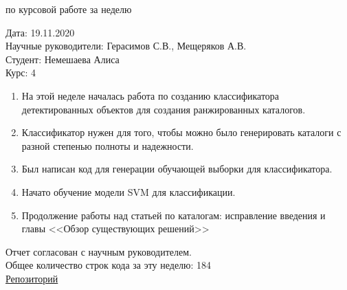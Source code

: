 \documentclass{article}
\begin{document}
\begin{center}{ по курсовой работе за неделю\\}\end{center}
Дата: 19.11.2020\\
Научные руководители: Герасимов С.В., Мещеряков А.В.\\
Студент: Немешаева Алиса\\
Курс: 4\\

\renewcommand{\labelitemi}{$\blacksquare$}
\renewcommand\labelitemii{$\square$}
\begin{enumerate}
    \item На этой неделе началась работа по созданию классификатора детектированных объектов для 
        создания ранжированных каталогов.\\
    \item Классификатор нужен для того, чтобы можно было генерировать каталоги с разной степенью 
        полноты и надежности.\\
    \item Был написан код для генерации обучающей выборки для классификатора.\\
    \item Начато обучение модели SVM для классификации.\\
    \item Продолжение работы над статьей по каталогам: исправление введения и главы <<Обзор 
        существующих решений>> 
\end{enumerate}

Отчет согласован с научным руководителем.\\
Общее количество строк кода за эту неделю: 184\\
\hyperlink{https://github.com/rt2122/data-segmentation-2}{Репозиторий}\\ 
\end{document}
